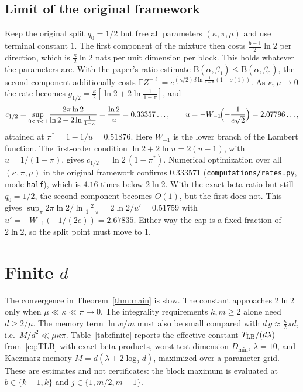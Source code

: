 \documentclass[11pt]{article}
\theoremstyle{definition}
\theoremstyle{remark}
\newcommand{\E}{\mathbb E}
\newcommand{\B}{\mathrm B}
\begin{document}
\subsection{Limit of the original framework}\label{sec:framework}
Keep the original split \(q_0=1/2\) but free all parameters \((\kappa,\pi,\mu)\) and use terminal constant \(1\). The first
component of the mixture then costs \(\frac{b-1}2\ln2\) per direction, which is \(\frac\kappa2\ln2\) nats per unit dimension per block.
This holds whatever the parameters are. With the paper's ratio estimate \(\B(\alpha,\beta_1)\le\B(\alpha,\beta_0)\), the second
component additionally costs \(\E Z^{-\ell}=e^{(\kappa/2)d\ln\frac1{1-\pi}(1+o(1))}\). As \(\kappa,\mu\to0\) the rate becomes
\(g_{1/2}=\frac\kappa2[\ln2+2\ln\frac1{1-\pi}]\), and
\[
 c_{1/2}=\sup_{0<\pi<1}\frac{2\pi\ln2}{\ln2+2\ln\frac1{1-\pi}}=\frac{\ln2}{u}=0.33357\ldots,\qquad
 u=-W_{-1}\!\Bigl(-\frac{1}{e\sqrt2}\Bigr)=2.07796\ldots,
\]
attained at \(\pi^*=1-1/u=0.51876\). Here \(W_{-1}\) is the lower branch of the Lambert function. The first-order condition
\(\ln2+2\ln u=2(u-1)\), with \(u=1/(1-\pi)\), gives \(c_{1/2}=\ln2\,(1-\pi^*)\). Numerical optimization over all
\((\kappa,\pi,\mu)\) in the original framework confirms \(0.333571\) (\texttt{computations/rates.py}, mode \texttt{half}), which is
\(4.16\) times below \(2\ln 2\). With the exact beta ratio but still \(q_0=1/2\), the second component becomes
\(O(1)\), but the first does not. This gives
\(\sup_\pi 2\pi\ln2/\ln\frac2{1-\pi}=2\ln2/u'=0.51759\) with \(u'=-W_{-1}(-1/(2e))=2.67835\). Either way the cap is a
fixed fraction of \(2\ln 2\), so the split point must move to \(1\).

\section{Finite \texorpdfstring{\(d\)}{d}}\label{sec:finite}
The convergence in Theorem~\ref{thm:main} is slow. The constant approaches \(2\ln 2\) only when
\(\mu\ll\kappa\ll\pi\to0\). The integrality requirements \(k,m\ge2\) alone need \(d\ge2/\mu\). The memory term
\(\ln w/m\) must also be small compared with \(d\,g\approx\frac{\kappa}{2}\pi d\), i.e.\ \(M/d^2\ll\mu\kappa\pi\). Table~\ref{tab:finite}
reports the effective constant \(T_{\rm LB}/(d\lambda)\) from~\eqref{eq:TLB} with exact beta products, worst test
dimension \(D_{\min}\), \(\lambda=10\), and Kaczmarz memory \(M=d(\lambda+2\log_2 d)\), maximized over a parameter grid.
These are estimates and not certificates: the block maximum is evaluated at \(b\in\{k-1,k\}\) and \(j\in\{1,m/2,m-1\}\).
\end{document}
